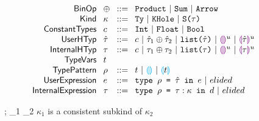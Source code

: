 \documentclass[12pt,letterpaper]{article}
\newcommand{\kconsubkind}[3]{#1 \vdash #2 \lesssim #3}
\newcommand{\kindAna}[3]{#1 \vdash #2 \Leftarrow #3}
\newcommand{\kequiv}[3]{#1 \vdash #2 \equiv #3}
\newcommand{\hPhi}{\Phi}
\newcommand{\hexp}{e}
\newcommand{\dexp}{d}
\newcommand{\htau}{\hat{\tau}}
\newcommand{\hkappa}{\kappa}
\newcommand{\dtau}{\tau}
\newcommand{\hrho}{\rho}
\newcommand{\Ty}{\textt{Ty}}
\newcommand{\KHole}{\textt{KHole}}
\newcommand{\KSing}[1]{\textt{S(}#1{\textt{)}}}
\newcommand{\hlist}[1]{\textt{list(}#1\textt{)}}
\newcommand{\llparenthesiscolor}{\textcolor{violet}{\llparenthesis}}
\newcommand{\rrparenthesiscolor}{\textcolor{violet}{\rrparenthesis}}
\newcommand{\llparenthesiscolorc}{\textcolor{cyan}{\llparenthesis}}
\newcommand{\rrparenthesiscolorc}{\textcolor{cyan}{\rrparenthesis}}
\newcommand{\hthole}[1]{\llparenthesiscolor\rrparenthesiscolor^{#1}}
\newcommand{\hhole}[2]{\llparenthesiscolor#1\rrparenthesiscolor^{#2}}
\newcommand{\patehole}{\llparenthesiscolorc\rrparenthesiscolorc}
\newcommand{\pathole}[1]{\llparenthesiscolorc#1\rrparenthesiscolorc}
\newcommand{\htdefine}[3]{\textt{type }#1 \textt{ = } #2\textt{ in }#3}
\newcommand{\dtdefine}[4]{\textt{type }#1 \textt{ = } #2 : #3\textt{ in }#4}
\begin{document}
\begin{figure}[t]
	$\arraycolsep=4pt\begin{array}{rllllll}
			\mathsf{BinOp}               & \oplus & ::= &
			\textt{Product} ~\vert~ \textt{Sum} ~\vert~ \textt{Arrow}                                          \\
			\mathsf{Kind}                & \kappa & ::= &
			\Ty ~\vert~ \KHole ~\vert~ \KSing{\tau}                                                            \\
			\mathsf{Constant Types}      & c      & ::= &
			\textt{Int} ~\vert~ \textt{Float} ~\vert~ \textt{Bool}                                             \\
			\mathsf{User HTyp}           & \htau  & ::= &
			c ~\vert~ \htau_1 \oplus \htau_2 ~\vert~ \hlist{\htau} ~\vert~ \hthole{u} ~\vert~ \hhole{\htau}{u} \\
			\mathsf{Internal HTyp}       & \dtau  & ::= &
			c ~\vert~ \dtau_1 \oplus \dtau_2 ~\vert~ \hlist{\dtau} ~\vert~ \hthole{u} ~\vert~ \hhole{\dtau}{u} \\
			\mathsf{Type Vars}           & t      &     &                                                      \\
			\mathsf{Type Pattern}        & \hrho  & ::= &
			t ~\vert~ \patehole ~\vert~ \pathole{t}                                                            \\
			\mathsf{User Expression}     & \hexp  & ::= &
			\htdefine{\hrho}{\htau}{\hexp} ~\vert~ elided                                                      \\
			\mathsf{Internal Expression} & \dtau  & ::= &
			\dtdefine{\hrho}{\dtau}{\hkappa}{\dexp} ~\vert~ elided                                             \\
		\end{array}$
\end{figure}

\begin{minipage}{\linewidth}
	\judgbox
	{\kconsubkind{\Delta;\hPhi}{\hkappa_1}{\hkappa_2}}
	{$\hkappa_1$ is a consistent subkind of $\hkappa_2$}
\end{minipage}
\\
\\
\end{document}
